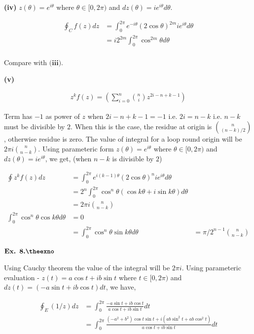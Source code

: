 \documentclass{article}
\def\tf{\textbf}
\newcounter{exno}
\begin{document}
\tf{(iv)} $z(\theta) = e^{i\theta}$ where $\theta \in [0,2\pi)$ and $dz(\theta) = ie^{i\theta}d\theta$.

\begin{align*}
    \oint_{C}f(z)dz &= \int_{0}^{2\pi}e^{-i\theta}(2\cos\theta)^{2m}ie^{i\theta}d\theta\\
    &= i2^{2m}\int_{0}^{2\pi}\cos^{2m}\theta d\theta\\
\end{align*}

Compare with $\tf{(iii)}$.

\tf{(v)} 

\begin{align*}
    z^kf(z) = (\sum_{i=0}^{n}\binom{n}{i}z^{2i-n + k-1})
\end{align*}

Term has $-1$ as power of $z$ when $2i-n+k-1=-1$ i.e. $2i = n-k$ i.e. $n-k$ must be divisible by $2$. When this is the case, the residue at origin is $\binom{n}{(n-k)/2}$, otherwise residue is zero. The value of integral for a loop round origin will be $2\pi i \binom{n}{n-k}$. Using parameteric form $z(\theta) = e^{i\theta}$ where $\theta \in [0,2\pi)$ and $dz(\theta) = ie^{i\theta}$, we get, (when $n-k$ is divisible by $2$)

\begin{align*}
    \oint z^kf(z)dz &= \int_{0}^{2\pi}e^{i(k-1)\theta}(2\cos\theta)^{n}ie^{i\theta}d\theta\\
    &= 2^n\int_{0}^{2\pi}\cos^n\theta (\cos k\theta + i\sin k\theta)d\theta\\
    &= 2\pi i \binom{n}{n-k}\\
    \int_{0}^{2\pi}\cos^n\theta \cos k\theta d\theta &= 0\\
    &= \int_{0}^{2\pi}\cos^n\theta \sin k\theta d\theta &= \pi/2^{n-1}\binom{n}{n-k}
\end{align*}

\vspace{0.2in}

${\textbf{Ex. 8.\theexno}}$\addtocounter{exno}{1}

Using Cauchy theorem the value of the integral will be $2\pi i$. Using parameteric evaluation - $z(t) = a\cos t + ib\sin t$ where $t \in [0,2\pi)$ and $dz(t) = (-a\sin t + ib\cos t)dt$, we have,

\begin{align*}
    \oint_{E}(1/z)dz &= \int_{0}^{2\pi}\frac{-a\sin t + ib\cos t}{a\cos t + ib\sin t} dt\\
    &= \int_{0}^{2\pi}\frac{(-a^2+b^2)\cos t\sin t + i(ab\sin^2 t + ab \cos^2 t)}{a\cos t + ib\sin t} dt\\
\end{align*}
\end{document}
